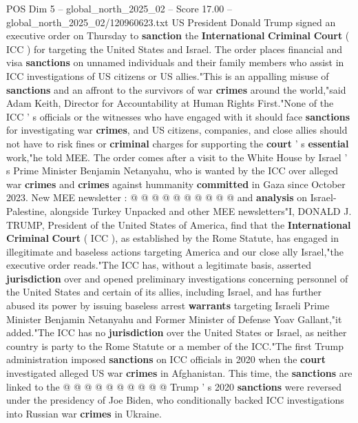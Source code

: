 \begin{textsample}{POS Dim 5 – global\_north\_2025\_02 – Score 17.00 – global\_north\_2025\_02/120960623.txt}  \label{ex:f5_pos_207}
US President Donald Trump signed an executive order on Thursday to \textbf{sanction} the \textbf{International} \textbf{Criminal} \textbf{Court} ( ICC ) for targeting the United States and Israel.
The order places financial and visa \textbf{sanctions} on unnamed individuals and their family members who assist in ICC investigations of US citizens or US allies."This is an appalling misuse of \textbf{sanctions} and an affront to the survivors of war \textbf{crimes} around the world,"said Adam Keith, Director for Accountability at Human Rights First."None of the ICC ' s officials or the witnesses who have engaged with it should face \textbf{sanctions} for investigating war \textbf{crimes}, and US citizens, companies, and close allies should not have to risk fines or \textbf{criminal} charges for supporting the \textbf{court} ' s \textbf{essential} work,"he told MEE.
The order comes after a visit to the White House by Israel ' s Prime Minister Benjamin Netanyahu, who is wanted by the ICC over alleged war \textbf{crimes} and \textbf{crimes} against hummanity \textbf{committed} in Gaza since October 2023.
New MEE newsletter : @ @ @ @ @ @ @ @ @ @ and \textbf{analysis} on Israel-Palestine, alongside Turkey Unpacked and other MEE newsletters"I, DONALD J.
TRUMP, President of the United States of America, find that the \textbf{International} \textbf{Criminal} \textbf{Court} ( ICC ), as established by the Rome Statute, has engaged in illegitimate and baseless actions targeting America and our close ally Israel,"the executive order reads."The ICC has, without a legitimate basis, asserted \textbf{jurisdiction} over and opened preliminary investigations concerning personnel of the United States and certain of its allies, including Israel, and has further abused its power by issuing baseless arrest \textbf{warrants} targeting Israeli Prime Minister Benjamin Netanyahu and Former Minister of Defense Yoav Gallant,"it added."The ICC has no \textbf{jurisdiction} over the United States or Israel, as neither country is party to the Rome Statute or a member of the ICC."The first Trump administration imposed \textbf{sanctions} on ICC officials in 2020 when the \textbf{court} investigated alleged US war \textbf{crimes} in Afghanistan.
This time, the \textbf{sanctions} are linked to the @ @ @ @ @ @ @ @ @ @ Trump ' s 2020 \textbf{sanctions} were reversed under the presidency of Joe Biden, who conditionally backed ICC investigations into Russian war \textbf{crimes} in Ukraine.

\end{textsample}
